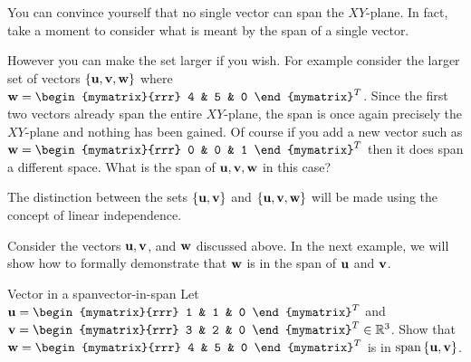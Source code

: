 You can convince yourself that no single vector can span the
$XY$-plane. In fact, take a moment to consider what is meant by the span of a single vector.

However you can make the set larger if you wish. For example consider
the larger set of vectors $\{\mbox{\bf u}, \mbox{\bf v},
\mbox{\bf w}\}$ where $ \vect{w}=\begin{mymatrix}{rrr}
4 & 5 & 0
\end{mymatrix}^T$. 
Since
the first two vectors already span the entire $XY$-plane, the span is
once again precisely the $XY$-plane and nothing has been gained. Of
course if you add a new vector such as
$ \vect{w}=\begin{mymatrix}{rrr}
0 & 0 & 1
\end{mymatrix}^T$ then it does span a different space. What is the span of $\mbox{\bf u}, \mbox{\bf v}, \mbox{\bf w}$ in this case?   

The distinction between the sets $\{\mbox{\bf u}, \mbox{\bf v}\}$ and $\{
\mbox{\bf u}, \mbox{\bf v}, \mbox{\bf w}\}$ will be made using the concept of linear independence. 

Consider the vectors $\mbox{\bf u}, \mbox{\bf v}$, and $\mbox{\bf w}$ discussed above. In the next example, we will show how to formally demonstrate that $\mbox{\bf w}$ is in the span of $\mbox{\bf u}$ and $\mbox{\bf v}$. 

\begin{example}{Vector in a span}{vector-in-span}
Let $\vect{u}=\begin{mymatrix}{rrr}
1  & 1 & 0
\end{mymatrix}^T$ and
$\vect{v}=\begin{mymatrix}{rrr}
3  & 2 & 0
\end{mymatrix}^T \in \R^{3}$. Show that $\vect{w} = \begin{mymatrix}{rrr}
4 & 5 & 0 
\end{mymatrix}^{T}$ is in $\sspan \set{\vect{u}, \vect{v} }$.
\end{example}

